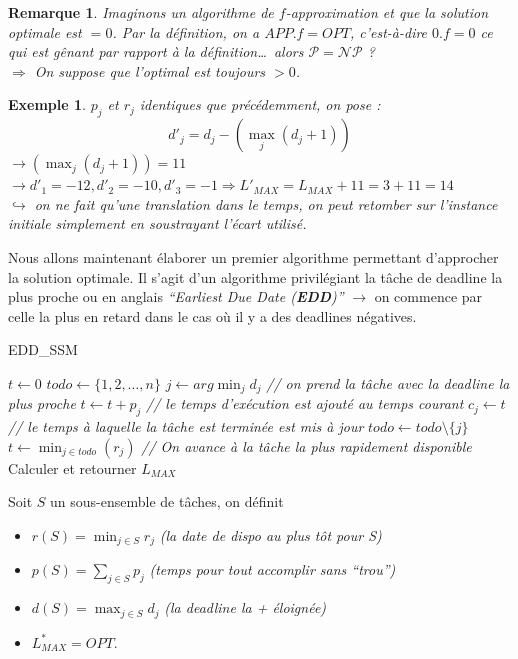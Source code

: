 \documentclass[12pt]{article}
\newtheorem{exemple}{Exemple}[section]
\newtheorem{rem}{Remarque}[section]
\begin{document}
\begin{rem}
Imaginons un algorithme de $f$-\textit{approximation} et que la solution
optimale est $=0$. Par la définition, on a $APP.f=OPT$, c'est-à-dire $0.f = 0$
ce qui est gênant par rapport à la définition\dots~alors
$\mathcal{P} = \mathcal{NP}$ ? \\
$\Rightarrow$ On suppose que l'optimal est toujours $> 0$.
\end{rem}

\begin{exemple}
$p_j$ et $r_j$ identiques que précédemment, on pose :
		  $$d'_j = d_j - (\max_j (d_j + 1))$$
$\rightarrow (\max_j (d_j + 1)) = 11$\\
$\rightarrow d'_1 = -12, d'_2 = -10, d'_3 = -1 \Rightarrow L'_{MAX} = L_{MAX} +
11 = 3+11 = 14$ \\
$\hookrightarrow$ on ne fait qu'une translation dans le temps, on peut retomber
sur l'instance initiale simplement en soustrayant l'écart utilisé.
\end{exemple}

Nous allons maintenant élaborer un premier algorithme permettant d'approcher la
solution optimale. Il s'agit d'un algorithme privilégiant la tâche de deadline
la plus proche ou en anglais \textit{``Earliest Due Date (\textbf{EDD})''}
$\rightarrow$ on commence par celle la plus en retard dans le cas où il y a des
deadlines négatives.

\begin{algorithm}[H]
\caption{EDD\_SSM}
\begin{algorithmic}[1]
\STATE $t\leftarrow 0$
\STATE $todo \leftarrow \{1,2,\ldots,n\}$
\STATE $j\leftarrow arg\min_j{d_j}$ \textit{// on prend la tâche avec la deadline
	la plus proche}
\STATE $t\leftarrow t+p_j$ \textit{// le temps d'exécution est ajouté au temps
courant}
\STATE $c_j \leftarrow t$ \textit{// le temps à laquelle la tâche est terminée
est mis à jour}
\STATE $todo \leftarrow todo \setminus \{j\}$
\ELSE
\STATE $t\leftarrow \min_{j\in todo}(r_j)$ \textit{// On avance à la tâche la
plus rapidement disponible}
\ENDIF
\ENDWHILE
\STATE Calculer et retourner $L_{MAX}$
\end{algorithmic}
\end{algorithm}

Soit $S$ un sous-ensemble de tâches, on définit
\begin{itemize}
\item $r(S) = \min_{j\in S} r_j$ \textit{(la date de dispo au plus tôt pour S)}
\item $p(S) = \sum_{j\in S} p_j$ \textit{(temps pour tout accomplir sans
``trou'')}
\item $d(S) = \max_{j\in S} d_j$ \textit{(la deadline la + éloignée)}
\item $L^*_{MAX} = OPT$.
\end{itemize}
\end{document}
